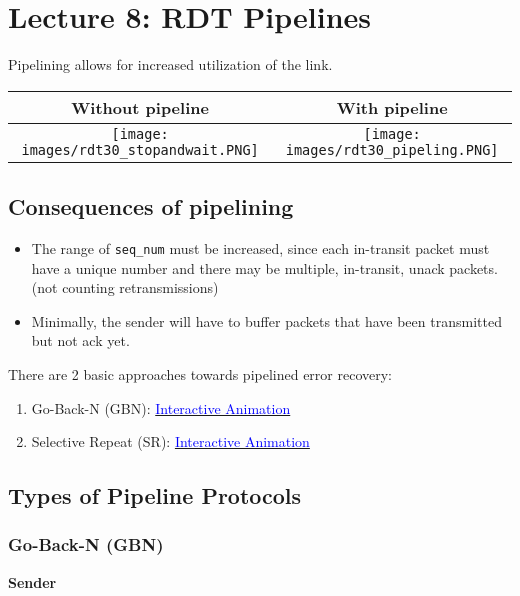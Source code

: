 \documentclass[a4paper]{article}
\begin{document}
\newpage
\section{Lecture 8: RDT Pipelines}
Pipelining allows for increased utilization of the link.
\begin{table}[H]
    \setcellgapes{5pt}
    \centering\makegapedcells
    \begin{tabular}[t]{|c|c|}
    \hline
    \textbf{Without pipeline} & \textbf{With pipeline} \\ \hline
    \texttt{[image: images/rdt30\_stopandwait.PNG]}&\texttt{[image: images/rdt30\_pipeling.PNG]}\\ \hline
    \end{tabular}
\end{table}

\subsection{Consequences of pipelining}
\begin{itemize}
    \item The range of \texttt{seq\_num} must be increased, since each in-transit packet must have a unique number and there may be multiple, in-transit, unack packets. (not counting retransmissions)
    \item Minimally, the sender will have to buffer packets that have been transmitted but not ack yet.
\end{itemize}
There are 2 basic approaches towards pipelined error recovery:
\begin{enumerate}
    \item Go-Back-N (GBN): \href{https://media.pearsoncmg.com/aw/ecs_kurose_compnetwork_7/cw/content/interactiveanimations/go-back-n-protocol/index.html}{\textcolor{blue}{Interactive Animation}}
    \item Selective Repeat (SR): \href{https://media.pearsoncmg.com/aw/ecs_kurose_compnetwork_7/cw/content/interactiveanimations/selective-repeat-protocol/index.html}{\textcolor{blue}{Interactive Animation}}
\end{enumerate}

\subsection{Types of Pipeline Protocols}
\subsubsection{Go-Back-N (GBN)}
\textbf{Sender}
\end{document}
